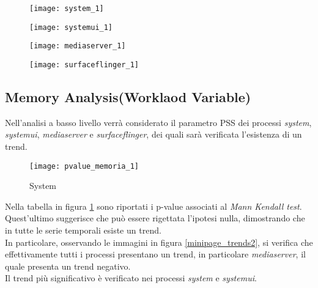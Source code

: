\begin{minipage}{\linewidth}
  \centering
  \begin{minipage}{0.49\linewidth}
    \begin{figure}[H]
      \texttt{[image: system\_1]}
    \end{figure}
  \end{minipage}
  \begin{minipage}{0.49\linewidth}
    \begin{figure}[H]
      \texttt{[image: systemui\_1]}
    \end{figure}
  \end{minipage}
  \begin{minipage}{0.49\linewidth}
    \begin{figure}[H]
      \texttt{[image: mediaserver\_1]}
    \end{figure}
  \end{minipage}
  \begin{minipage}{0.49\linewidth}
    \begin{figure}[H]
      \texttt{[image: surfaceflinger\_1]}
    \end{figure}
  \end{minipage}
\end{minipage}
\label{minipage_trends}

\clearpage
\subsection{Memory Analysis(Worklaod Variable)}

Nell'analisi a basso livello verrà considerato il parametro PSS dei processi \textit{system},
\textit{systemui}, \textit{mediaserver} e \textit{surfaceflinger}, dei quali
sarà verificata l'esistenza di un trend.\\

\begin{figure}[!htbp]
  \centering
  \texttt{[image: pvalue\_memoria\_1]}
  \caption{System}
  \label{pvalue_memoria_1}
\end{figure}

Nella tabella in figura \ref{pvalue_memoria_1} sono riportati i p-value associati
al \textit{Mann Kendall test}.\\
Quest'ultimo suggerisce che può essere rigettata l'ipotesi nulla, dimostrando
che in tutte le serie temporali esiste un trend.\\
In particolare, osservando le immagini in figura \ref{minipage_trends2}, si verifica che effettivamente
tutti i processi presentano un trend, in particolare \textit{mediaserver},
il quale presenta un trend negativo.\\
Il trend più significativo è verificato nei processi \textit{system} e \textit{systemui}.

